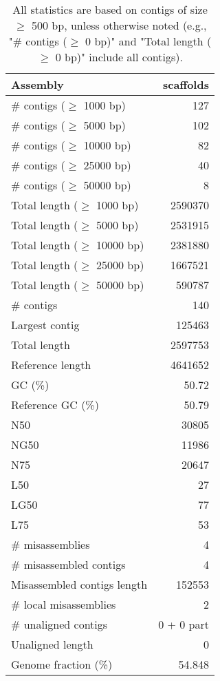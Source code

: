 \documentclass[12pt,a4paper]{article}
\begin{document}
\begin{table}[ht]
\begin{center}
\caption{All statistics are based on contigs of size $\geq$ 500 bp, unless otherwise noted (e.g., "\# contigs ($\geq$ 0 bp)" and "Total length ($\geq$ 0 bp)" include all contigs).}
\begin{tabular}{|l*{1}{|r}|}
\hline
Assembly & scaffolds \\ \hline
\# contigs ($\geq$ 1000 bp) & 127 \\ \hline
\# contigs ($\geq$ 5000 bp) & 102 \\ \hline
\# contigs ($\geq$ 10000 bp) & 82 \\ \hline
\# contigs ($\geq$ 25000 bp) & 40 \\ \hline
\# contigs ($\geq$ 50000 bp) & 8 \\ \hline
Total length ($\geq$ 1000 bp) & 2590370 \\ \hline
Total length ($\geq$ 5000 bp) & 2531915 \\ \hline
Total length ($\geq$ 10000 bp) & 2381880 \\ \hline
Total length ($\geq$ 25000 bp) & 1667521 \\ \hline
Total length ($\geq$ 50000 bp) & 590787 \\ \hline
\# contigs & 140 \\ \hline
Largest contig & 125463 \\ \hline
Total length & 2597753 \\ \hline
Reference length & 4641652 \\ \hline
GC (\%) & 50.72 \\ \hline
Reference GC (\%) & 50.79 \\ \hline
N50 & 30805 \\ \hline
NG50 & 11986 \\ \hline
N75 & 20647 \\ \hline
L50 & 27 \\ \hline
LG50 & 77 \\ \hline
L75 & 53 \\ \hline
\# misassemblies & 4 \\ \hline
\# misassembled contigs & 4 \\ \hline
Misassembled contigs length & 152553 \\ \hline
\# local misassemblies & 2 \\ \hline
\# unaligned contigs & 0 + 0 part \\ \hline
Unaligned length & 0 \\ \hline
Genome fraction (\%) & 54.848 \\ \hline

\end{tabular}
\end{center}
\end{table}
\end{document}
